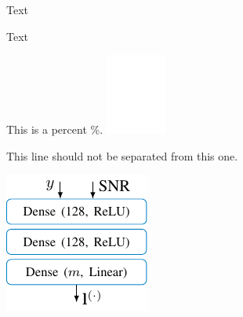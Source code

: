 
Text

Text%


This is a percent \%.
\includegraphics{images/im1_included.png}

This line should not be separated
%
from this one.

\newif\ifvar

\ifvar
\fi



\includegraphics{ext_tikz/test1.pdf}






